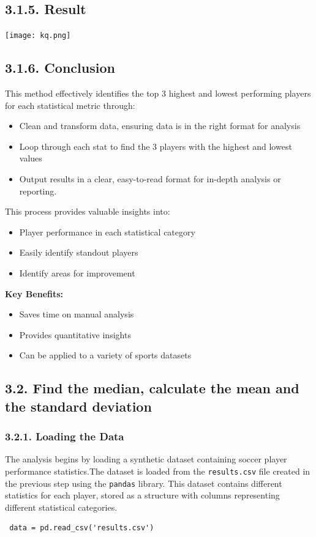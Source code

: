 \documentclass[a4paper,12pt]{article}
\begin{document}
\subsection*{\textbf{3.1.5. Result}}

\texttt{[image: kq.png]}

\subsection*{\textbf{3.1.6. Conclusion}}
This method effectively identifies the top 
3 highest and lowest performing players for each statistical metric through:
\begin{itemize}
    \item Clean and transform data, ensuring data is in the right format for analysis
    \item Loop through each stat to find the 3 players with the highest and lowest values
    \item Output results in a clear, easy-to-read format for in-depth analysis or reporting.
\end{itemize}
This process provides valuable insights into:
\begin{itemize}
    \item Player performance in each statistical category
    \item Easily identify standout players
    \item Identify areas for improvement
\end{itemize}
\textbf{Key Benefits:}
\begin{itemize}
    \item Saves time on manual analysis
    \item Provides quantitative insights
    \item Can be applied to a variety of sports datasets
\end{itemize}

\subsection*{\textbf{\large 3.2. Find the median, calculate the mean and the standard deviation}}
\subsubsection*{\textbf{3.2.1. Loading the Data}}
The analysis begins by loading a synthetic dataset containing soccer player performance statistics.The dataset is loaded from the \texttt{results.csv} file created in the previous step using the \texttt{pandas} library. This dataset contains different statistics for each player, stored as a structure with columns representing different statistical categories.
\begin{mdframed}
\begin{verbatim}
 data = pd.read_csv('results.csv')
\end{verbatim}
\end{mdframed}
\end{document}
